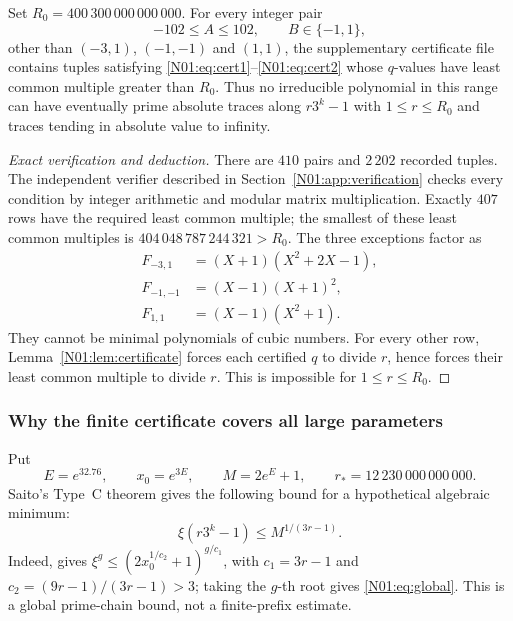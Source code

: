 \documentclass[11pt,a4paper]{article}
\theoremstyle{definition}\newtheorem{definition}[theorem]{Definition}
\theoremstyle{remark}\newtheorem{remark}[theorem]{Remark}
\begin{document}
\begin{proposition}\label{N01:prop:finite}
Set $R_0=400\,300\,000\,000\,000$. For every integer pair
\[
 -102\le A\le102,\qquad B\in\{-1,1\},
\]
other than $(-3,1)$, $(-1,-1)$ and $(1,1)$, the supplementary
certificate file contains tuples satisfying
\eqref{N01:eq:cert1}--\eqref{N01:eq:cert2} whose $q$-values have least common
multiple greater than $R_0$. Thus no irreducible polynomial in this
range can have eventually prime absolute traces along $r3^k-1$
with $1\le r\le R_0$ and traces tending in absolute value to infinity.
\end{proposition}
\begin{proof}[Exact verification and deduction]
There are $410$ pairs and $2\,202$ recorded tuples. The independent
verifier described in Section~\ref{N01:app:verification} checks every
condition by integer arithmetic and modular matrix multiplication.
Exactly $407$ rows have the required least common multiple; the
smallest of these least common multiples is
$404\,048\,787\,244\,321>R_0$.
The three exceptions factor as
\begin{align*}
 F_{-3,1}&=(X+1)(X^2+2X-1),\\
 F_{-1,-1}&=(X-1)(X+1)^2,\\
 F_{1,1}&=(X-1)(X^2+1).
\end{align*}
They cannot be minimal polynomials of cubic numbers.
For every other row, Lemma~\ref{N01:lem:certificate} forces each certified
$q$ to divide $r$, hence forces their least common multiple to divide
$r$. This is impossible for $1\le r\le R_0$.
\end{proof}

\subsubsection{Why the finite certificate covers all large parameters}

Put
\begin{equation}\label{N01:eq:constants}
 E=e^{32.76},\qquad x_0=e^{3E},\qquad M=2e^E+1,
 \qquad r_*=12\,230\,000\,000\,000.
\end{equation}
Saito's Type~C theorem gives the following bound for a hypothetical
algebraic minimum:
\begin{equation}\label{N01:eq:global}
 \xi(r3^k-1)\le M^{1/(3r-1)}.
\end{equation}
Indeed, \cite[Theorem~2.6 and its application in Section~2.3]{Saito}
gives $\xi^g\le(2x_0^{1/c_2}+1)^{g/c_1}$, with
$c_1=3r-1$ and $c_2=(9r-1)/(3r-1)>3$; taking the $g$-th root
gives \eqref{N01:eq:global}. This is a global prime-chain bound, not a
finite-prefix estimate.
\end{document}
